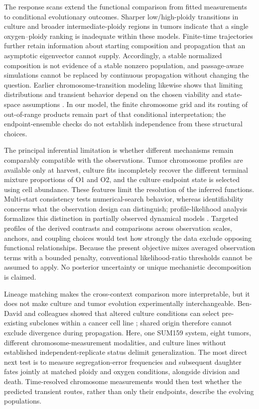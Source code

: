 \documentclass[11pt]{article}
\let\cite\supercite
\begin{document}
The response scans extend the functional comparison from fitted measurements to conditional evolutionary outcomes. Sharper low/high-ploidy transitions in culture and broader intermediate-ploidy regions in tumors indicate that a single oxygen--ploidy ranking is inadequate within these models. Finite-time trajectories further retain information about starting composition and propagation that an asymptotic eigenvector cannot supply. Accordingly, a stable normalized composition is not evidence of a stable nonzero population, and passage-aware simulations cannot be replaced by continuous propagation without changing the question. Earlier chromosome-transition modeling likewise shows that limiting distributions and transient behavior depend on the chosen viability and state-space assumptions \cite{elizalde_markov_2018}. In our model, the finite chromosome grid and its routing of out-of-range products remain part of that conditional interpretation; the endpoint-ensemble checks do not establish independence from these structural choices.

The principal inferential limitation is whether different mechanisms remain comparably compatible with the observations. Tumor chromosome profiles are available only at harvest, culture fits incompletely recover the different terminal mixture proportions of O1 and O2, and the culture endpoint state is selected using cell abundance. These features limit the resolution of the inferred functions. Multi-start consistency tests numerical-search behavior, whereas identifiability concerns what the observation design can distinguish; profile-likelihood analysis formalizes this distinction in partially observed dynamical models \cite{raue_structural_2009}. Targeted profiles of the derived contrasts and comparisons across observation scales, anchors, and coupling choices would test how strongly the data exclude opposing functional relationships. Because the present objective mixes averaged observation terms with a bounded penalty, conventional likelihood-ratio thresholds cannot be assumed to apply. No posterior uncertainty or unique mechanistic decomposition is claimed.

Lineage matching makes the cross-context comparison more interpretable, but it does not make culture and tumor evolution experimentally interchangeable. Ben-David and colleagues showed that altered culture conditions can select pre-existing subclones within a cancer cell line \cite{ben-david_genetic_2018}; shared origin therefore cannot exclude divergence during propagation. Here, one SUM159 system, eight tumors, different chromosome-measurement modalities, and culture lines without established independent-replicate status delimit generalization. The most direct next test is to measure segregation-error frequencies and subsequent daughter fates jointly at matched ploidy and oxygen conditions, alongside division and death. Time-resolved chromosome measurements would then test whether the predicted transient routes, rather than only their endpoints, describe the evolving populations.
\end{document}
